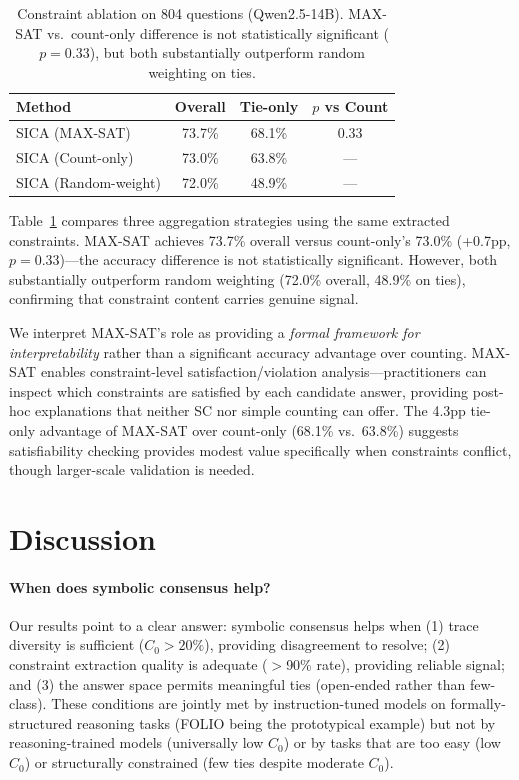 \documentclass[11pt,a4paper]{article}
\begin{document}
\begin{table}[t]
\centering
\small
\begin{tabular}{@{}lccc@{}}
\toprule
\textbf{Method} & \textbf{Overall} & \textbf{Tie-only} & \textbf{$p$ vs Count} \\
\midrule
SICA (MAX-SAT) & 73.7\% & 68.1\% & 0.33 \\
SICA (Count-only) & 73.0\% & 63.8\% & --- \\
SICA (Random-weight) & 72.0\% & 48.9\% & --- \\
\bottomrule
\end{tabular}
\caption{Constraint ablation on 804 questions (Qwen2.5-14B). MAX-SAT vs.\ count-only difference is not statistically significant ($p=0.33$), but both substantially outperform random weighting on ties.}
\label{tab:ablation}
\end{table}

Table~\ref{tab:ablation} compares three aggregation strategies using the same extracted constraints. MAX-SAT achieves 73.7\% overall versus count-only's 73.0\% (+0.7pp, $p=0.33$)---the accuracy difference is not statistically significant. However, both substantially outperform random weighting (72.0\% overall, 48.9\% on ties), confirming that constraint content carries genuine signal.

We interpret MAX-SAT's role as providing a \emph{formal framework for interpretability} rather than a significant accuracy advantage over counting. MAX-SAT enables constraint-level satisfaction/violation analysis---practitioners can inspect which constraints are satisfied by each candidate answer, providing post-hoc explanations that neither SC nor simple counting can offer. The 4.3pp tie-only advantage of MAX-SAT over count-only (68.1\% vs.\ 63.8\%) suggests satisfiability checking provides modest value specifically when constraints conflict, though larger-scale validation is needed.

\section{Discussion}

\paragraph{When does symbolic consensus help?} Our results point to a clear answer: symbolic consensus helps when (1) trace diversity is sufficient ($C_0 > 20\%$), providing disagreement to resolve; (2) constraint extraction quality is adequate ($>$90\% rate), providing reliable signal; and (3) the answer space permits meaningful ties (open-ended rather than few-class). These conditions are jointly met by instruction-tuned models on formally-structured reasoning tasks (FOLIO being the prototypical example) but not by reasoning-trained models (universally low $C_0$) or by tasks that are too easy (low $C_0$) or structurally constrained (few ties despite moderate $C_0$).
\end{document}
